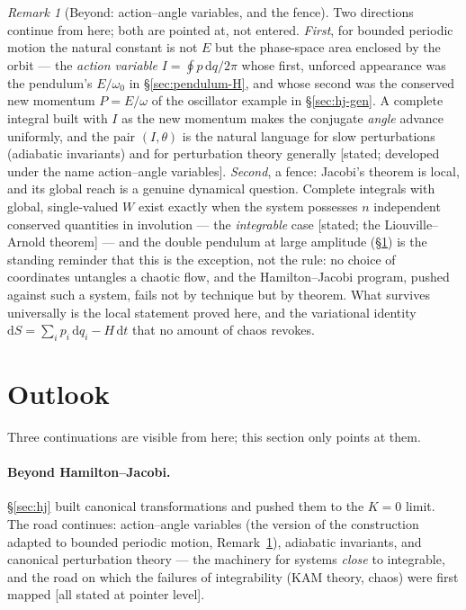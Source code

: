 \documentclass[11pt]{article}
\theoremstyle{plain}
\theoremstyle{definition}
\theoremstyle{remark}
\newtheorem{remark}[theorem]{Remark}
\newcommand{\dd}{\mathrm{d}}
\begin{document}
\begin{remark}[Beyond: action--angle variables, and the fence]
\label{rem:hj-beyond}
Two directions continue from here; both are pointed at, not entered.
\emph{First}, for bounded periodic motion the natural constant is not
$E$ but the phase-space area enclosed by the orbit --- the
\emph{action variable} $I = \oint p\,\dd q/2\pi$ whose first, unforced
appearance was the pendulum's $E/\omega_0$ in \S\ref{sec:pendulum-H},
and whose second was the conserved new momentum $P = E/\omega$ of the
oscillator example in \S\ref{sec:hj-gen}.
A complete integral built with $I$ as the new momentum makes the
conjugate \emph{angle} advance uniformly, and the pair $(I, \theta)$
is the natural language for slow perturbations (adiabatic invariants)
and for perturbation theory generally [stated; developed under the
name action--angle variables]. \emph{Second}, a fence: Jacobi's
theorem is local, and its global reach is a genuine dynamical
question. Complete integrals with global, single-valued $W$ exist
exactly when the system possesses $n$ independent conserved quantities
in involution --- the \emph{integrable} case [stated; the
Liouville--Arnold theorem] --- and the double pendulum at large
amplitude (\S\ref{sec:outlook}) is the standing reminder that this is
the exception, not the rule: no choice of coordinates untangles a
chaotic flow, and the Hamilton--Jacobi program, pushed against such a
system, fails not by technique but by theorem. What survives
universally is the local statement proved here, and the variational
identity $\dd S = \sum_i p_i\,\dd q_i - H\,\dd t$ that no amount of
chaos revokes.
\end{remark}

\section{Outlook}
\label{sec:outlook}

Three continuations are visible from here; this section only points
at them.

\paragraph{Beyond Hamilton--Jacobi.}
\S\ref{sec:hj} built canonical transformations and pushed them to the
$K = 0$ limit. The road continues: action--angle variables (the version
of the construction adapted to bounded periodic motion,
Remark~\ref{rem:hj-beyond}), adiabatic invariants, and canonical
perturbation theory --- the machinery for systems \emph{close} to
integrable, and the road on which the failures of integrability (KAM
theory, chaos) were first mapped [all stated at pointer level].
\end{document}
